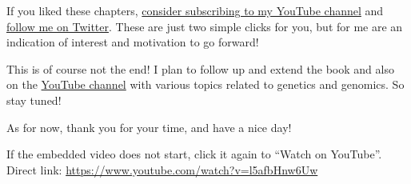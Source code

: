 \documentclass[]{book}
\begin{document}
If you liked these chapters,
\href{https://www.youtube.com/channel/UCXuX-kQ1TbKHWeB75NgmhlA}{consider
subscribing to my YouTube channel} and
\href{https://twitter.com/GaborM_ABG}{follow me on Twitter}. These are
just two simple clicks for you, but for me are an indication of interest
and motivation to go forward!

This is of course not the end! I plan to follow up and extend the book
and also on the
\href{https://www.youtube.com/channel/UCXuX-kQ1TbKHWeB75NgmhlA}{YouTube
channel} with various topics related to genetics and genomics. So stay
tuned!

As for now, thank you for your time, and have a nice day!

If the embedded video does not start, click it again to ``Watch on
YouTube''. Direct link:
\url{https://www.youtube.com/watch?v=l5afbHnw6Uw}


\end{document}
